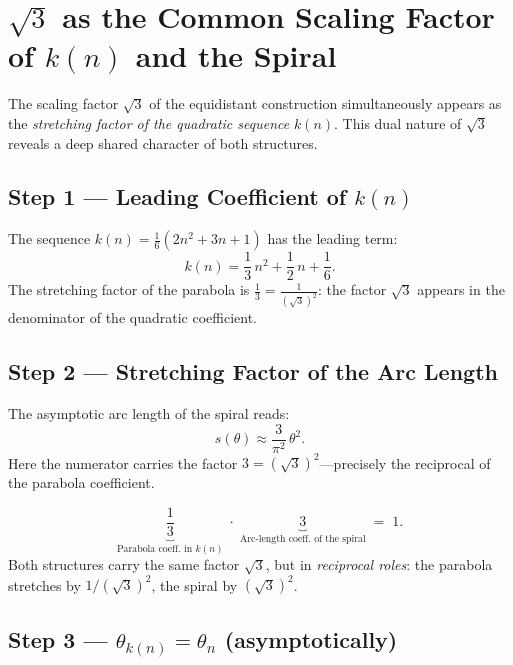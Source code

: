 \section{\texorpdfstring{$\sqrt{3}$}{sqrt(3)} as the Common Scaling Factor of \texorpdfstring{$k(n)$}{k(n)} and the Spiral}

The scaling factor $\sqrt{3}$ of the equidistant
construction simultaneously appears as the \emph{stretching factor of
the quadratic sequence} $k(n)$. This dual nature of $\sqrt{3}$
reveals a deep shared character of both structures.

\subsection{Step 1 --- Leading Coefficient of \texorpdfstring{$k(n)$}{k(n)}}

The sequence $k(n) = \tfrac{1}{6}(2n^2 + 3n + 1)$ has the leading term:
\[
  k(n) = \frac{1}{3}\,n^2 + \frac{1}{2}\,n + \frac{1}{6}.
\]
The stretching factor of the parabola is $\tfrac{1}{3} = \tfrac{1}{(\sqrt{3})^2}$:
the factor $\sqrt{3}$ appears in the denominator of the quadratic coefficient.

\subsection{Step 2 --- Stretching Factor of the Arc Length}

The asymptotic arc length of the spiral reads:
\[
  s(\theta) \approx \frac{3}{\pi^2}\,\theta^2.
\]
Here the numerator carries the factor $3 = (\sqrt{3})^2$---precisely the
reciprocal of the parabola coefficient.

\begin{tcolorbox}[
  colback=blue!3, colframe=blue!40!black, enhanced,
  title={Reciprocal Relationship of the Stretching Factors}]
\[
  \underbrace{\frac{1}{3}}_{\text{Parabola coeff.\ in }k(n)}
  \;\cdot\;
  \underbrace{3}_{\text{Arc-length coeff.\ of the spiral}}
  \;=\; 1.
\]
Both structures carry the same factor $\sqrt{3}$, but in
\emph{reciprocal roles}: the parabola stretches by $1/(\sqrt{3})^2$,
the spiral by $(\sqrt{3})^2$.
\end{tcolorbox}

\subsection{Step 3 --- \texorpdfstring{$\theta_{k(n)} = \theta_n$}{Angular Agreement} (asymptotically)}


